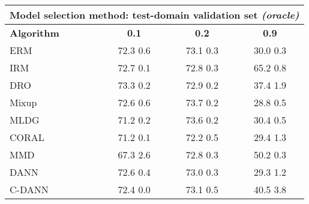 \documentclass{article}
\begin{document}
\begin{center}
\begin{tabular}{lccc}
\toprule
\multicolumn{4}{c}{\textbf{Model selection method: test-domain validation set \textit{(oracle)}}} \\
\midrule
\textbf{Algorithm}    & \textbf{0.1}              & \textbf{0.2}              & \textbf{0.9}              \\
\midrule
ERM                       & 72.3  0.6            & 73.1  0.3            & 30.0  0.3            \\
IRM                       & 72.7  0.1            & 72.8  0.3            & 65.2  0.8            \\
DRO                 & 73.3  0.2            & 72.9  0.2            & 37.4  1.9            \\
Mixup                     & 72.6  0.6            & 73.7  0.2            & 28.8  0.5            \\
MLDG                      & 71.2  0.2            & 73.6  0.2            & 30.4  0.5            \\
CORAL                     & 71.2  0.1            & 72.2  0.5            & 29.4  1.3            \\
MMD                       & 67.3  2.6            & 72.8  0.3            & 50.2  0.3            \\
DANN                       & 72.6  0.4            & 73.0  0.3            & 29.3  1.2            \\
C-DANN                   & 72.4  0.0            & 73.1  0.5            & 40.5  3.8            \\
\bottomrule
\end{tabular}
\end{center}

\clearpage
\newpage
\end{document}
